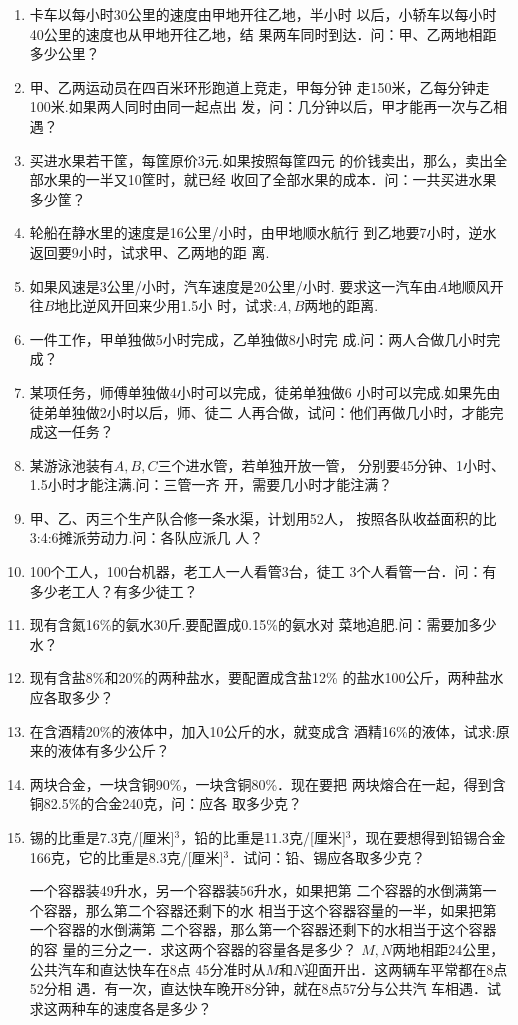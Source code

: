 \begin{enumerate}
\item  卡车以每小时30公里的速度由甲地开往乙地，半小时
以后，小轿车以每小时40公里的速度也从甲地开往乙地，结
果两车同时到达．问：甲、乙两地相距多少公里？
\item  甲、乙两运动员在四百米环形跑道上竞走，甲每分钟
走150米，乙每分钟走100米.如果两人同时由同一起点出
发，问：几分钟以后，甲才能再一次与乙相遇？
\item  买进水果若干筐，每筐原价3元.如果按照每筐四元
的价钱卖出，那么，卖出全部水果的一半又10筐时，就已经
收回了全部水果的成本．问：一共买进水果多少筐？
\item  轮船在静水里的速度是16公里/小时，由甲地顺水航行
到乙地要7小时，逆水返回要9小时，试求甲、乙两地的距
离.
\item  如果风速是3公里/小时，汽车速度是20公里/小时.
要求这一汽车由$A$地顺风开往$B$地比逆风开回来少用1.5小
时，试求:$A,B$两地的距离.
\item  一件工作，甲单独做5小时完成，乙单独做8小时完
成.问：两人合做几小时完成？
\item  某项任务，师傅单独做4小时可以完成，徒弟单独做6
小时可以完成.如果先由徒弟单独做2小时以后，师、徒二
人再合做，试问：他们再做几小时，才能完成这一任务？
\item  某游泳池装有$A, B, C$三个进水管，若单独开放一管，
分别要45分钟、1小时、1.5小时才能注满.问：三管一齐
开，需要几小时才能注满？
\item  甲、乙、丙三个生产队合修一条水渠，计划用52人，
按照各队收益面积的比3:4:6摊派劳动力.问：各队应派几
人？
\item  100个工人，100台机器，老工人一人看管3台，徒工
3个人看管一台．问：有多少老工人？有多少徒工？
\item  现有含氮16\%的氨水30斤.要配置成0.15\%的氨水对
菜地追肥.问：需要加多少水？
\item  现有含盐8\%和20\%的两种盐水，要配置成含盐12\%
的盐水100公斤，两种盐水应各取多少？

\item  在含酒精20\%的液体中，加入10公斤的水，就变成含
酒精16\%的液体，试求:原来的液体有多少公斤？
\item  两块合金，一块含铜90\%，一块含铜80\%．现在要把
两块熔合在一起，得到含铜82.5\%的合金240克，问：应各
取多少克？

\item 锡的比重是7.3克/[厘米]$^3$，铅的比重是11.3克/[厘米]$^3$，现在要想得到铅锡合金166克，它的比重是8.3克/[厘米]$^3$．试问：铅、锡应各取多少克？

\staritem 一个容器装49升水，另一个容器装56升水，如果把第
二个容器的水倒满第一个容器，那么第二个容器还剩下的水
相当于这个容器容量的一半，如果把第一个容器的水倒满第
二个容器，那么第一个容器还剩下的水相当于这个容器的容
量的三分之一．求这两个容器的容量各是多少？
\staritem $M, N$两地相距24公里，公共汽车和直达快车在8点
45分准时从$M$和$N$迎面开出．这两辆车平常都在8点52分相
遇．有一次，直达快车晚开8分钟，就在8点57分与公共汽
车相遇．试求这两种车的速度各是多少？

\end{enumerate}

